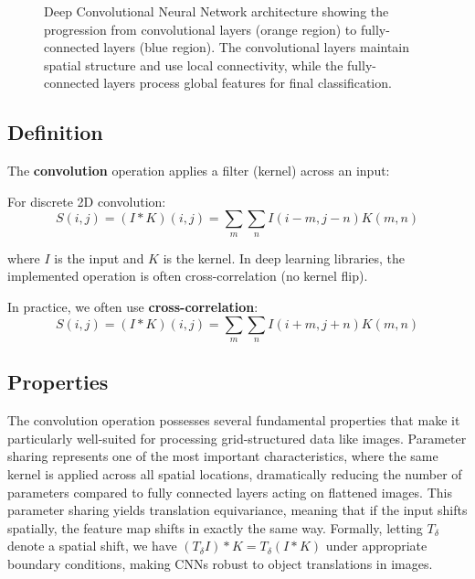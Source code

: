 \begin{figure}[h]
\caption{Deep Convolutional Neural Network architecture showing the progression from convolutional layers (orange region) to fully-connected layers (blue region). The convolutional layers maintain spatial structure and use local connectivity, while the fully-connected layers process global features for final classification.}
\label{fig:deep-cnn-architecture}
\end{figure}

\subsection{Definition}

The \textbf{convolution} operation applies a filter (kernel) across an input:

For discrete 2D convolution:
\begin{equation}
S(i,j) = (I * K)(i,j) = \sum_m \sum_n I(i-m, j-n) K(m, n)
\end{equation}

where $I$ is the input and $K$ is the kernel. In deep learning libraries, the implemented operation is often cross-correlation (no kernel flip).

In practice, we often use \textbf{cross-correlation}:
\begin{equation}
S(i,j) = (I * K)(i,j) = \sum_m \sum_n I(i+m, j+n) K(m, n)
\end{equation}

\subsection{Properties}

The convolution operation possesses several fundamental properties that make it particularly well-suited for processing grid-structured data like images. Parameter sharing represents one of the most important characteristics, where the same kernel is applied across all spatial locations, dramatically reducing the number of parameters compared to fully connected layers acting on flattened images. This parameter sharing yields translation equivariance, meaning that if the input shifts spatially, the feature map shifts in exactly the same way. Formally, letting \(T_\delta\) denote a spatial shift, we have \((T_\delta I) * K = T_\delta (I * K)\) under appropriate boundary conditions, making CNNs robust to object translations in images.

